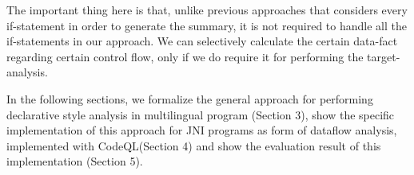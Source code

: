 The important thing here is that, unlike previous approaches that considers
every if-statement in order to generate the summary, it is not required to
handle all the if-statements in our approach. We can selectively calculate the
certain data-fact regarding certain control flow, only if we do require it for
performing the target-analysis.

In the following sections, we formalize the general approach for performing
declarative style analysis in multilingual program (Section 3), show the
specific implementation of this approach for JNI programs as form of dataflow
analysis, implemented with CodeQL(Section 4) and show the evaluation result of
this implementation (Section 5).
